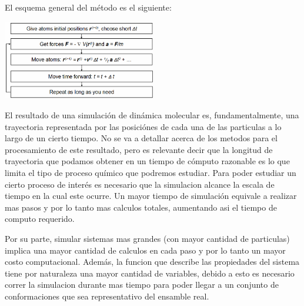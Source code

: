 \documentclass[a4paper,10pt]{report}
\begin{document}
El esquema general del método es el siguiente:


\begin{center}
\includegraphics[keepaspectratio, width=0.5\textwidth]{img/mdalgorithm.png}
\end{center}



\vspace{20pt}



  



El resultado de una simulación de dinámica molecular es, fundamentalmente, una trayectoria representada por las posiciónes de cada una de las particulas a lo largo de un cierto tiempo.
No se va a detallar acerca de los metodos para el procesamiento de este resultado, pero es relevante decir que la longitud de trayectoria que podamos obtener en un tiempo de cómputo razonable es lo que limita el tipo de proceso químico que podremos estudiar.
Para poder estudiar un cierto proceso de interés es necesario que la simulacion alcance la escala de tiempo en la cual este ocurre. Un mayor tiempo de simulación equivale a realizar mas pasos y por lo tanto mas calculos totales, aumentando asi el tiempo de computo requerido.

Por su parte, simular sistemas mas grandes (con mayor cantidad de particulas) implica una mayor cantidad de calculos en cada paso y por lo tanto un mayor costo computacional. Además, la funcion que describe las propiedades del sistema tiene por naturaleza una mayor cantidad de variables, debido a esto es necesario  correr la simulacion durante mas tiempo para poder llegar a un conjunto de conformaciones que sea representativo del ensamble real.
\end{document}
